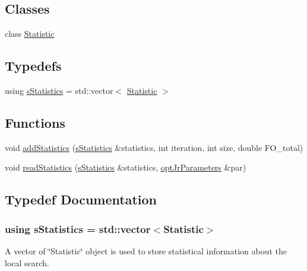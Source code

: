 \subsection*{Classes}
\begin{DoxyCompactItemize}
\item 
class \hyperlink{classStatistic}{Statistic}
\end{DoxyCompactItemize}
\subsection*{Typedefs}
\begin{DoxyCompactItemize}
\item 
using \hyperlink{statistics_8hh_abd0800e960b601bba1c0734f6f8e4949}{s\-Statistics} = std\-::vector$<$ \hyperlink{classStatistic}{Statistic} $>$
\end{DoxyCompactItemize}
\subsection*{Functions}
\begin{DoxyCompactItemize}
\item 
void \hyperlink{statistics_8hh_a3e40d76b988cd89aade3253394444b34}{add\-Statistics} (\hyperlink{statistics_8hh_abd0800e960b601bba1c0734f6f8e4949}{s\-Statistics} \&statistics, int iteration, int size, double F\-O\-\_\-total)
\item 
void \hyperlink{statistics_8hh_a202f8e6d9896663ccc22e85450db0112}{read\-Statistics} (\hyperlink{statistics_8hh_abd0800e960b601bba1c0734f6f8e4949}{s\-Statistics} \&statistics, \hyperlink{classoptJrParameters}{opt\-Jr\-Parameters} \&par)
\end{DoxyCompactItemize}


\subsection{Typedef Documentation}
\hypertarget{statistics_8hh_abd0800e960b601bba1c0734f6f8e4949}{
\subsubsection[{s\-Statistics}]{\setlength{\rightskip}{0pt plus 5cm}using {\bf s\-Statistics} =  std\-::vector$<${\bf Statistic}$>$}}\label{statistics_8hh_abd0800e960b601bba1c0734f6f8e4949}
A vector of \char`\"{}\-Statistic\char`\"{} object is used to store statistical information about the local search. 

